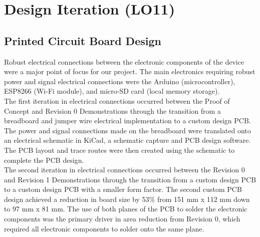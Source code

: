 \documentclass[12pt]{article}
\begin{document}

\section{Design Iteration (LO11)}


\subsection{Printed Circuit Board Design}
Robust electrical connections between the electronic components of the device were a major point of focus for our project. The main electronics requiring robust power and signal electrical connections were the Arduino (microcontroller), ESP8266 (Wi-Fi module), and micro-SD card (local memory storage). \\

The first iteration in electrical connections occurred between the Proof of Concept and Revision 0 Demonstrations through the transition from a breadboard and jumper wire electrical implementation to a custom design PCB. The power and signal connections made on the breadboard were translated onto an electrical schematic in KiCad, a schematic capture and PCB design software. The PCB layout and trace routes were then created using the schematic to complete the PCB design. \\

The second iteration in electrical connections occurred between the Revision 0 and Revision 1 Demonstrations through the transition from a custom design PCB to a custom design PCB with a smaller form factor. The second custom PCB design achieved a reduction in board size by 53\% from 151 mm x 112 mm down to 97 mm x 81 mm. The use of both planes of the PCB to solder the electronic components was the primary driver in area reduction from Revision 0, which required all electronic components to solder onto the same plane. \\
\end{document}
